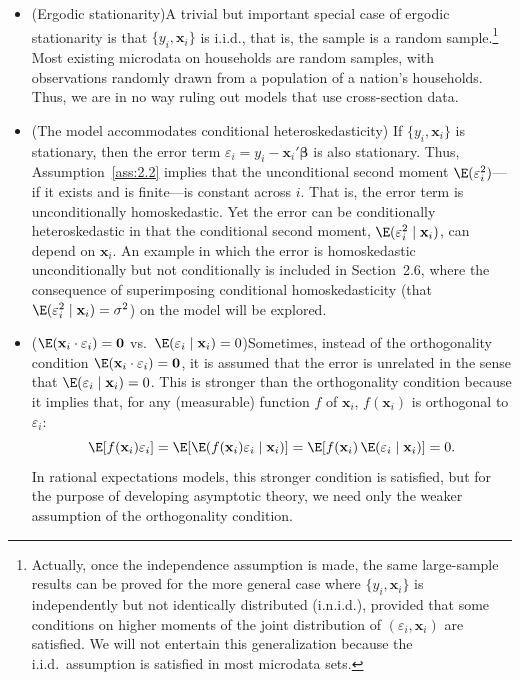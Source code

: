 \begin{itemize}
\item (Ergodic stationarity)\quad A trivial but important special case of ergodic
  stationarity is that $\{y_i, \mathbf{x}_i\}$ is i.i.d., that is, the sample is a
  random sample.\footnote{Actually, once the independence assumption is made, the same
  large-sample results can be proved for the more general case where
  $\{y_i, \mathbf{x}_i\}$ is independently but not identically distributed (i.n.i.d.),
  provided that some conditions on higher moments of the joint distribution of
  $(\varepsilon_i, \mathbf{x}_i)$ are satisfied.  We will not entertain this
  generalization because the i.i.d.\ assumption is satisfied in most microdata sets.}
  Most existing microdata on households are random samples, with observations
  randomly drawn from a population of a nation's households.  Thus, we are in no
  way ruling out models that use cross-section data.

\item (The model accommodates conditional heteroskedasticity)\quad
  If $\{y_i, \mathbf{x}_i\}$ is stationary, then the error term
  $\varepsilon_i = y_i - \mathbf{x}_i'\bm{\beta}$ is also stationary.  Thus,
  Assumption~\ref{ass:2.2} implies that the unconditional second moment
  $\E(\varepsilon_i^2)$---if it exists and is finite---is constant across $i$.  That
  is, the error term is unconditionally homoskedastic.  Yet the error can be
  conditionally heteroskedastic in that the conditional second moment,
  $\E(\varepsilon_i^2 \mid \mathbf{x}_i)$, can depend on $\mathbf{x}_i$.  An example
  in which the error is homoskedastic unconditionally but not conditionally is
  included in Section~2.6, where the consequence of superimposing conditional
  homoskedasticity (that $\E(\varepsilon_i^2 \mid \mathbf{x}_i) = \sigma^2$) on the
  model will be explored.

\item ($\E(\mathbf{x}_i \cdot \varepsilon_i) = \mathbf{0}$ vs.\
  $\E(\varepsilon_i \mid \mathbf{x}_i) = 0$)\quad Sometimes, instead of the
  orthogonality condition $\E(\mathbf{x}_i \cdot \varepsilon_i) = \mathbf{0}$, it is
  assumed that the error is unrelated in the sense that
  $\E(\varepsilon_i \mid \mathbf{x}_i) = 0$.  This is stronger than the orthogonality
  condition because it implies that, for any (measurable) function $f$ of
  $\mathbf{x}_i$, $f(\mathbf{x}_i)$ is orthogonal to $\varepsilon_i$:
  \[
    \E[f(\mathbf{x}_i)\varepsilon_i]
    = \E[\E(f(\mathbf{x}_i)\varepsilon_i \mid \mathbf{x}_i)]
    = \E[f(\mathbf{x}_i)\,\E(\varepsilon_i \mid \mathbf{x}_i)] = 0.
  \]
  In rational expectations models, this stronger condition is satisfied, but for the
  purpose of developing asymptotic theory, we need only the weaker assumption of the
  orthogonality condition.


\end{itemize}
